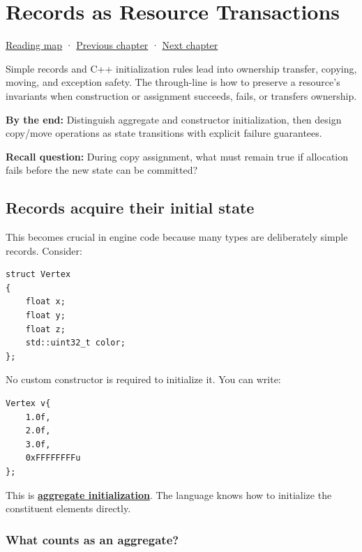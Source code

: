 \hypertarget{01-foundations-i-ch003}{}
\chapter{Records as Resource Transactions}\label{01-foundations-i-ch003-records-as-resource-transactions}

\hyperref[volume-reading-map]{Reading map} · \hyperref[01-foundations-i-ch002-values-at-addresses-layout-lifetimes-and-representation]{Previous chapter} · \hyperref[01-foundations-i-ch004-prove-c-ownership-with-runnable-experiments]{Next chapter}

Simple records and C++ initialization rules lead into ownership transfer, copying, moving, and exception safety. The through-line is how to preserve a resource's invariants when construction or assignment succeeds, fails, or transfers ownership.

\textbf{By the end:} Distinguish aggregate and constructor initialization, then design copy/move operations as state transitions with explicit failure guarantees.

\textbf{Recall question:} During copy assignment, what must remain true if allocation fails before the new state can be committed?

\section{Records acquire their initial state}\label{01-foundations-i-ch003-records-acquire-their-initial-state}

This becomes crucial in engine code because many types are deliberately simple records. Consider:

\begin{verbatim}
struct Vertex
{
    float x;
    float y;
    float z;
    std::uint32_t color;
};
\end{verbatim}

No custom constructor is required to initialize it. You can write:

\begin{verbatim}
Vertex v{
    1.0f,
    2.0f,
    3.0f,
    0xFFFFFFFFu
};
\end{verbatim}

This is \textbf{\hyperref[appendix-b7174c179542]{aggregate initialization}}. The language knows how to initialize the constituent elements directly.

\subsection{What counts as an aggregate?}\label{01-foundations-i-ch003-what-counts-as-an-aggregate}

